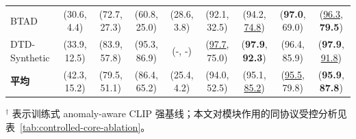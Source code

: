 \begin{table}[t]
{\begin{tabular}{lcccccccc}
BTAD & (30.6, 4.4) & (72.7, 27.3) & (60.8, 25.0) & (28.6, 3.8) & (92.1, 32.5) & (94.2, \underline{74.8}) & (\textbf{97.0}, 69.0) & (\underline{96.3}, \textbf{79.5}) \\
DTD-Synthetic & (33.9, 12.5) & (83.9, 57.8) & (95.3, 86.9) & (-, -) & (\underline{97.7}, 75.0) & (\textbf{97.9}, \textbf{92.3}) & (96.4, 85.9) & (\textbf{97.9}, \underline{91.8}) \\
\midrule
\textbf{平均} & (42.3, 15.2) & (79.5, 51.1) & (86.4, 65.2) & (25.4, 4.2) & (94.0, 52.5) & (95.1, \underline{85.2}) & (\underline{95.5}, 79.8) & (\textbf{95.9}, \textbf{87.8}) \\
\bottomrule
\end{tabular}%
}
\vspace{0.25em}
\footnotesize $^{\dagger}$ 表示训练式 anomaly-aware CLIP 强基线；本文对模块作用的同协议受控分析见表~\ref{tab:controlled-core-ablation}。
\end{table}
